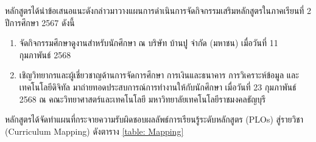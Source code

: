 หลักสูตรได้นำข้อเสนอแนะดังกล่าวมาวางแผนการดำเนินการจัดกิจกรรมเสริมหลักสูตรในภาคเรียนที่ 2 ปีการศึกษา 2567 ดังนี้
\begin{enumerate}
	\item จัดกิจกรรมศึกษาดูงานสำหรับนักศึกษา ณ บริษัท บ้านปู จำกัด (มหาชน) เมื่อวันที่ 11 กุมภาพันธ์ 2568 
	\item เชิญวิทยากรและผู้เชี่ยวชาญด้านการจัดการศึกษา การเงินและธนาคาร การวิเคราะห์ข้อมูล และเทคโนโลยีดิจิทัล มาถ่ายทอดประสบการณ์การทำงานให้กับนักศึกษา เมื่อวันที่ 23 กุมภาพันธ์ 2568 ณ คณะวิทยาศาสตร์และเทคโนโลยี มหาวิทยาลัยเทคโนโลยีราชมงคลธัญบุรี
\end{enumerate}
\begin{doclist}
\docitem{\printprogram{} }
\end{doclist}


หลักสูตรได้จัดทำแผนที่กระจายความรับผิดชอบผลลัพธ์การเรียนรู้ระดับหลักสูตร (PLOs) สู่รายวิชา (Curriculum Mapping) ดังตาราง \ref{table: Mapping}


